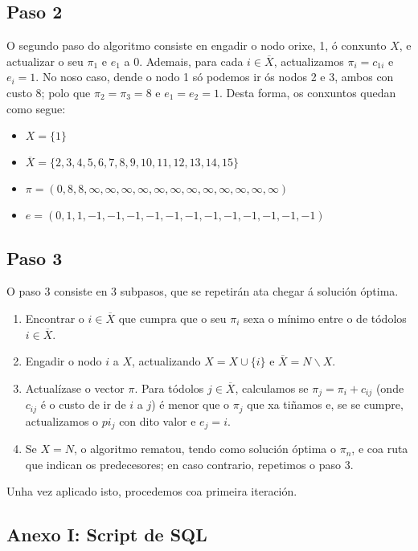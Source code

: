 \documentclass[a4paper,onecolumn]{article}
\let\stdsection\section
\renewcommand\section{\newpage\stdsection}
\begin{document}
\subsection{Paso 2}\label{paso2}
O segundo paso do algoritmo consiste en engadir o nodo orixe, 1, ó conxunto $X$, e actualizar o seu $\pi_1$ e $e_1$ a 0. Ademais, para cada $i\in\overline{X}$, actualizamos $\pi_i=c_{1i}$ e $e_i=1$. No noso caso, dende o nodo 1 só podemos ir ós nodos 2 e 3, ambos con custo 8; polo que $\pi_2=\pi_3=8$ e $e_1=e_2=1$. Desta forma, os conxuntos quedan como segue:
\begin{itemize}
    \item $X=\{1\}$
    \item $\overline{X}=\{2, 3, 4, 5, 6, 7, 8, 9, 10, 11, 12, 13, 14, 15\}$
    \item $\pi = (0, 8, 8, \infty, \infty, \infty, \infty, \infty, \infty, \infty, \infty, \infty, \infty, \infty, \infty )$
    \item $e = (0, 1, 1, -1, -1, -1, -1, -1, -1, -1, -1, -1, -1, -1, -1 )$
\end{itemize}

\subsection{Paso 3}\label{paso3}
O paso 3 consiste en 3 subpasos, que se repetirán ata chegar á solución óptima. 
\begin{enumerate}[label=\roman*)]
    \item Encontrar o $i \in \overline{X}$ que cumpra que o seu $\pi_i$ sexa o mínimo entre o de tódolos $i \in \overline{X}$.
    \item Engadir o nodo $i$ a $X$, actualizando $X=X\cup\{i\}$ e $\overline{X}=N\backslash X$.
    \item Actualízase o vector $\pi$. Para tódolos $j\in\overline{X}$, calculamos se $\pi_j=\pi_i+c_{ij}$ (onde $c_{ij}$ é o custo de ir de $i$ a $j$) é menor que o $\pi_j$ que xa tiñamos e, se se cumpre, actualizamos o $pi_j$ con dito valor e $e_j=i$.
    \item Se $X=N$, o algoritmo rematou, tendo como solución óptima o $\pi_n$, e coa ruta que indican os predecesores; en caso contrario, repetimos o paso 3.
\end{enumerate}

Unha vez aplicado isto, procedemos coa primeira iteración.

\newpage
\begin{appendices}
\section{Anexo I: Script de SQL}\label{apendice}

\lstset{language=R}
%

\end{appendices}
\end{document}
